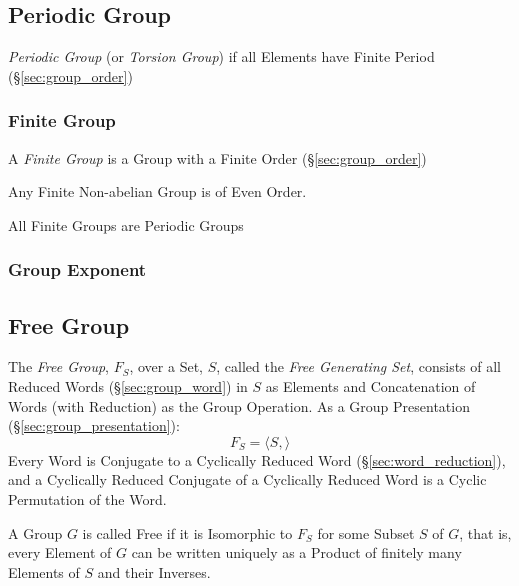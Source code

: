 \subsection{Periodic Group}\label{sec:periodic_group}

\emph{Periodic Group} (or \emph{Torsion Group}) if all Elements have
Finite Period (\S\ref{sec:group_order})



\subsubsection{Finite Group}\label{sec:finite_group}

A \emph{Finite Group} is a Group with a Finite Order (\S\ref{sec:group_order})

Any Finite Non-abelian Group is of Even Order.

All Finite Groups are Periodic Groups



\subsubsection{Group Exponent}\label{sec:group_exponent}



\subsection{Free Group}\label{sec:free_group}

The \emph{Free Group}, $F_S$, over a Set, $S$, called the \emph{Free
  Generating Set}, consists of all Reduced Words
(\S\ref{sec:group_word}) in $S$ as Elements and Concatenation of Words
(with Reduction) as the Group Operation. As a Group Presentation
(\S\ref{sec:group_presentation}):
\[
    F_S = \langle S, \rangle
\]
Every Word is Conjugate to a Cyclically Reduced Word
(\S\ref{sec:word_reduction}), and a Cyclically Reduced Conjugate of a
Cyclically Reduced Word is a Cyclic Permutation of the Word.

A Group $G$ is called Free if it is Isomorphic to $F_S$ for some
Subset $S$ of $G$, that is, every Element of $G$ can be written
uniquely as a Product of finitely many Elements of $S$ and their
Inverses.

